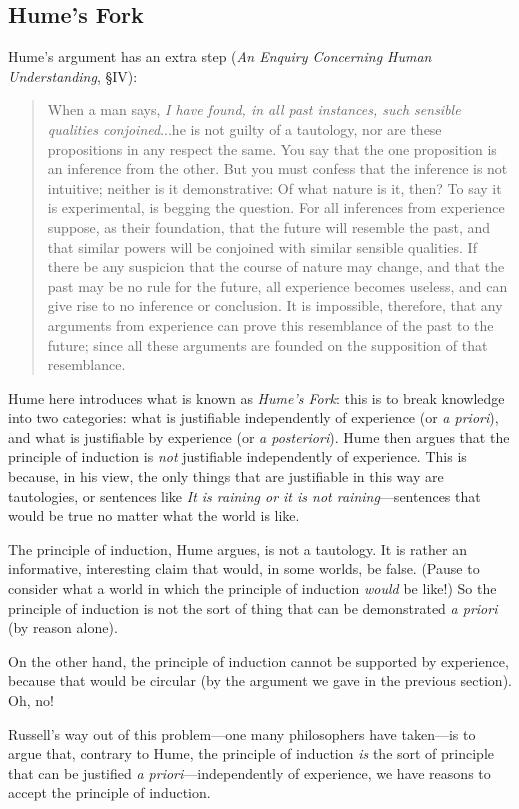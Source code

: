 \documentclass[oneside,letterpaper,12pt]{book}
\begin{document}
\subsection*{Hume's Fork}
Hume's argument has an extra step (\textit{An Enquiry Concerning Human Understanding}, \S IV):
\begin{quote}
	When a man says, \textit{I have found, in all past instances, such sensible qualities conjoined}...he is not guilty of a tautology, nor are these propositions in any respect the same. You say that the one proposition is an inference from the other. But you must confess that the inference is not intuitive; neither is it demonstrative: Of what nature is it, then? To say it is experimental, is begging the question. For all inferences from experience suppose, as their foundation, that the future will resemble the past, and that similar powers will be conjoined with similar sensible qualities. If there be any suspicion that the course of nature may change, and that the past may be no rule for the future, all experience becomes useless, and can give rise to no inference or conclusion. It is impossible, therefore, that any arguments from experience can prove this resemblance of the past to the future; since all these arguments are founded on the supposition of that resemblance.
\end{quote}
Hume here introduces what is known as \textit{Hume's Fork}: this is to break knowledge into two categories: what is justifiable independently of experience (or \textit{a priori}), and what is justifiable by experience (or \textit{a posteriori}). Hume then argues that the principle of induction is \textit{not} justifiable independently of experience. This is because, in his view, the only things that are justifiable in this way are tautologies, or sentences like \textit{It is raining or it is not raining}---sentences that would be true no matter what the world is like.

The principle of induction, Hume argues, is not a tautology. It is rather an informative, interesting claim that would, in some worlds, be false. (Pause to consider what a world in which the principle of induction \textit{would} be like!) So the principle of induction is not the sort of thing that can be demonstrated \textit{a priori} (by reason alone).

On the other hand, the principle of induction cannot be supported by experience, because that would be circular (by the argument we gave in the previous section). Oh, no!

Russell's way out of this problem---one many philosophers have taken---is to argue that, contrary to Hume, the principle of induction \textit{is} the sort of principle that can be justified \textit{a priori}---independently of experience, we have reasons to accept the principle of induction. 
\end{document}

